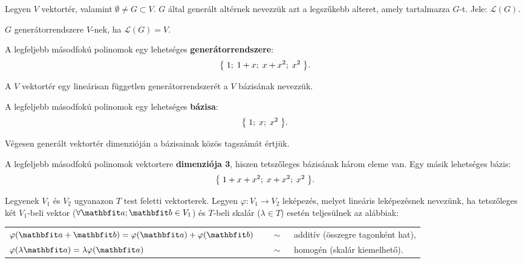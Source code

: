 \documentclass{szb-practice}
\begin{document}
\begin{definition}[Generátorrendszer]
  Legyen $V$ vektortér, valamint $\emptyset \neq G \subset V$. $G$ által
  generált altérnek nevezzük azt a legszűkebb alteret, amely tartalmazza $G$-t.
  Jele: $\mathcal L(G)$.

  $G$ generátorrendszere $V$-nek, ha $\mathcal L(G) = V$.
\end{definition}

\begin{example}
  A legfeljebb másodfokú polinomok egy lehetséges \textbf{generátorrendszere}:
  $$
    \big\{
    \;1;
    \;1 + x;
    \;x + x^2;
    \;x^2
    \;\big\}
    \text.
  $$
\end{example}

\begin{definition}[Bázis]
  A $V$ vektortér egy lineárisan független generátorrendszerét a $V$
  bázisának nevezzük.
\end{definition}

\begin{example}
  A legfeljebb másodfokú polinomok egy lehetséges \textbf{bázisa}:
  $$
    \big\{
    \;1;
    \;x;
    \;x^2
    \;\big\}
    \text.
  $$
\end{example}

\begin{definition}
  Végesen generált vektortér dimenzióján a bázisainak közös tagszámát értjük.
\end{definition}

\begin{example}[][nobreak]
  A legfeljebb másodfokú polinomok vektortere \textbf{dimenziója 3}, hiszen
  tetszőleges bázisának három eleme van. Egy másik lehetséges bázis:
  $$
    \big\{
    \;1 + x + x^2;
    \;x + x^2;
    \;x^2
    \;\big\}
    \text.
  $$
\end{example}

\begin{definition}
  Legyenek $V_1$ és $V_2$ ugyanazon $T$ test feletti vektorterek. Legyen
  $\varphi: V_1 \rightarrow V_2$ leképezés, melyet lineáris leképezésnek
  nevezünk, ha tetszőleges két $V_1$-beli vektor ($\forall \rvec a; \rvec b \in
    V_1$) és $T$-beli skalár ($\lambda \in T$) esetén teljesülnek az alábbiak:

  \def\arraystretch{1.5}
  \begin{tabular}{>{\bullet\;}l>{$\quad \sim \quad$}l}
    $\varphi(\rvec a + \rvec b) = \varphi(\rvec a) + \varphi(\rvec b)$
     & additív (összegre tagonként hat), \\
    $\varphi(\lambda \rvec a) = \lambda \varphi(\rvec a)$
     & homogén (skalár kiemelhető).
  \end{tabular}
\end{definition}
\end{document}
